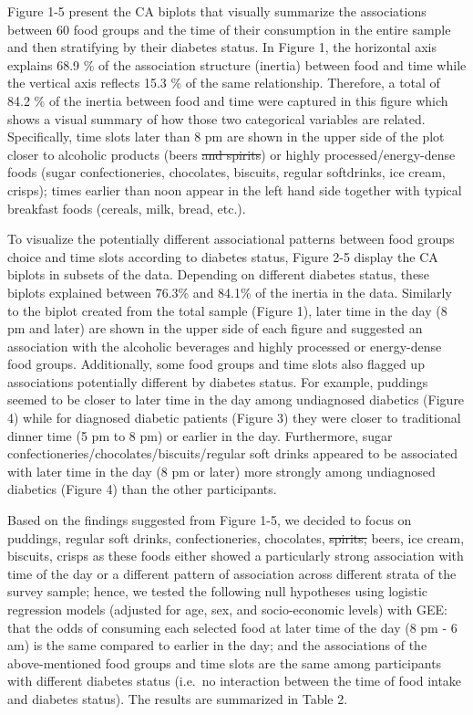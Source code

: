 \documentclass[utf8]{frontiersSCNS}
\providecommand{\DIFaddtex}[1]{{\protect\color{blue}\uwave{#1}}} %
\providecommand{\DIFdeltex}[1]{{\protect\color{red}\sout{#1}}}                      %
\providecommand{\DIFaddbegin}{} %
\providecommand{\DIFaddend}{} %
\providecommand{\DIFdelbegin}{} %
\providecommand{\DIFdelend}{} %
\providecommand{\DIFadd}[1]{\texorpdfstring{\DIFaddtex{#1}}{#1}} %
\providecommand{\DIFdel}[1]{\texorpdfstring{\DIFdeltex{#1}}{}} %
\newcommand{\DIFscaledelfig}{0.5}
\newlength{\DIFdelgraphicswidth} %
\newlength{\DIFdelgraphicsheight} %
\newcommand{\DIFaddincludegraphics}[2][]{{\color{blue}\fbox{\DIFOincludegraphics[#1]{#2}}}} %
\newcommand{\DIFdelincludegraphics}[2][]{%
\sbox{\DIFdelgraphicsbox}{\DIFOincludegraphics[#1]{#2}}%
\settoboxwidth{\DIFdelgraphicswidth}{\DIFdelgraphicsbox} %
\settoboxtotalheight{\DIFdelgraphicsheight}{\DIFdelgraphicsbox} %
\scalebox{\DIFscaledelfig}{%
\parbox[b]{\DIFdelgraphicswidth}{\usebox{\DIFdelgraphicsbox}\\[-\baselineskip] \rule{\DIFdelgraphicswidth}{0em}}\llap{\resizebox{\DIFdelgraphicswidth}{\DIFdelgraphicsheight}{%
\setlength{\unitlength}{\DIFdelgraphicswidth}%
\begin{picture}(1,1)%
\thicklines\linethickness{2pt} %
{\color[rgb]{1,0,0}\put(0,0){\framebox(1,1){}}}%
{\color[rgb]{1,0,0}\put(0,0){\line( 1,1){1}}}%
{\color[rgb]{1,0,0}\put(0,1){\line(1,-1){1}}}%
\end{picture}%
}\hspace*{3pt}}} %
} %
\DeclareRobustCommand{\DIFaddbegin}{\DIFOaddbegin \let\includegraphics\DIFaddincludegraphics} %
\DeclareRobustCommand{\DIFaddend}{\DIFOaddend \let\includegraphics\DIFOincludegraphics} %
\DeclareRobustCommand{\DIFdelbegin}{\DIFOdelbegin \let\includegraphics\DIFdelincludegraphics} %
\DeclareRobustCommand{\DIFdelend}{\DIFOaddend \let\includegraphics\DIFOincludegraphics} %
\begin{document}
Figure 1-5 present the CA biplots that visually summarize the
associations between 60 food groups and the time of their consumption in
the entire sample and then stratifying by their diabetes status. In
Figure 1, the horizontal axis explains 68.9 \% of the association
structure (inertia) between food and time while the vertical axis
reflects 15.3 \% of the same relationship. Therefore, a total of 84.2 \%
of the inertia between food and time were captured in this figure which
shows a visual summary of how those two categorical variables are
related. Specifically, time slots later than 8 pm are shown in the upper
side of the plot closer to alcoholic products (beers \DIFdelbegin \DIFdel{and spirits}\DIFdelend \DIFaddbegin \DIFadd{etc.}\DIFaddend ) or highly
processed/energy-dense foods (sugar confectioneries, chocolates,
biscuits, regular softdrinks, ice cream, crisps); times earlier than
noon appear in the left hand side together with typical breakfast foods
(cereals, milk, bread, etc.).

To visualize the potentially different associational patterns between
food groups choice and time slots according to diabetes status, Figure
2-5 display the CA biplots in subsets of the data. Depending on
different diabetes status, these biplots explained between 76.3\% and
84.1\% of the inertia in the data. Similarly to the biplot created from
the total sample (Figure 1), later time in the day (8 pm and later) are
shown in the upper side of each figure and suggested an association with
the alcoholic beverages and highly processed or energy-dense food
groups. Additionally, some food groups and time slots also flagged up
associations potentially different by diabetes status. For example,
puddings seemed to be closer to later time in the day among undiagnosed
diabetics (Figure 4) while for diagnosed diabetic patients (Figure 3)
they were closer to traditional dinner time (5 pm to 8 pm) or earlier in
the day. Furthermore, sugar confectioneries/chocolates/biscuits/regular
soft drinks appeared to be associated with later time in the day (8 pm
or later) more strongly among undiagnosed diabetics (Figure 4) than the
other participants.

Based on the findings suggested from Figure 1-5, we decided to focus on
puddings, regular soft drinks, confectioneries, chocolates, \DIFdelbegin \DIFdel{spirits,
}\DIFdelend beers, ice
cream, biscuits, crisps as these foods either showed a particularly
strong association with time of the day or a different pattern of
association across different strata of the survey sample; hence, we
tested the following null hypotheses using logistic regression models
(adjusted for age, sex, and socio-economic levels) with GEE: that the
odds of consuming each selected food at later time of the day (8 pm - 6
am) is the same compared to earlier in the day; and the associations of
the above-mentioned food groups and time slots are the same among
participants with different diabetes status (i.e.~no interaction between
the time of food intake and diabetes status). The results are summarized
in Table 2.
\end{document}
